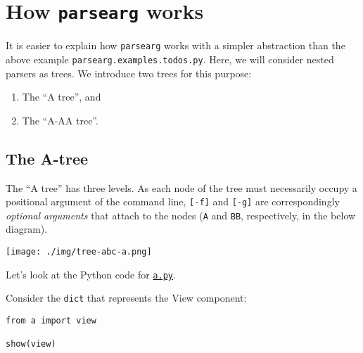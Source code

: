 \documentclass[10pt]{amsart}
\numberwithin{equation}{section}
\begin{document}
\section{How \texttt{parsearg} works}
\label{sec:org326fd20}
It is easier to explain how \texttt{parsearg} works with a simpler abstraction 
than the above example \texttt{parsearg.examples.todos.py}. Here, we will 
consider nested parsers as trees. We introduce two trees for this purpose:
\begin{enumerate}
\item The ``A tree'', and
\item The ``A-AA tree''.
\end{enumerate}

\subsection{The A-tree}
\label{sec:org281a2bf}
The ``A tree'' has three levels. As each node of the tree must
necessarily occupy a positional argument of the command line,
\texttt{[-f]} and \texttt{[-g]} are correspondingly \emph{optional arguments} that attach to the nodes 
(\texttt{A} and \texttt{BB}, respectively, in the below diagram). 
\begin{center}
\texttt{[image: ./img/tree-abc-a.png]}
\end{center}

Let's look at the Python code for \href{https://github.com/tharte/parsearg/blob/master/parsearg/examples/a.py}{\texttt{a.py}}.

Consider the \texttt{dict} that represents the View component:
\begin{verbatim}
from a import view

show(view)
\end{verbatim}
\end{document}
